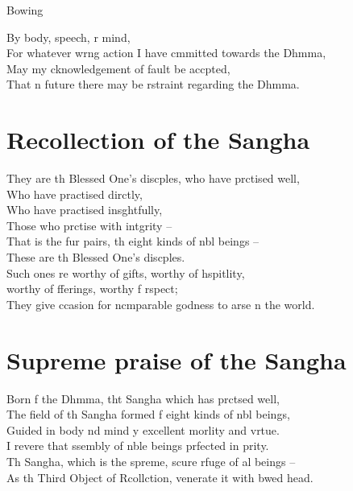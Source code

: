 \clearpage

\begin{instruction}%
  Bowing
\end{instruction}

By body, speech, r mind,\\
For whatever wrng action I have cmmitted towards the Dhmma,\\
May my cknowledgement of fault be accpted,\\
That n future there may be rstraint regarding the Dhmma.

\chapter{Recollection of the Sangha}%

\begin{leader}
\end{leader}

They are th Blessed One's discples, who have prctised well,\\
Who have practised dirctly,\\
Who have practised insghtfully,\\
Those who prctise with intgrity --\\
That is the fur pairs, th eight kinds of nbl beings --\\
These are th Blessed One's discples.\\
Such ones re worthy of gifts, worthy of hspitlity,\\
\vin worthy of fferings, worthy f rspect;\\
They give ccasion for ncmparable godness to arse n the world.

\chapter{Supreme praise of the Sangha}%

\begin{leader}
\end{leader}

Born f the Dhmma, tht Sangha which has prctsed well,\\
The field of th Sangha formed f eight kinds of nbl beings,\\
Guided in body nd mind y excellent morlity and vrtue.\\
I revere that ssembly of nble beings prfected in prity.\\
Th Sangha, which is the spreme, scure rfuge of al beings --\\
As th Third Object of Rcollction,  venerate it with bwed head.


